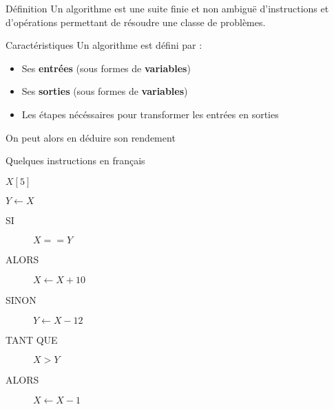 \begin{frame}{Définition}
    Un algorithme est une suite finie et non ambiguë d'instructions et d’opérations permettant de résoudre une classe de problèmes.
\end{frame}

\begin{frame}{Caractéristiques}
    Un algorithme est défini par :
    \begin{itemize}
        \item Ses \textbf{entrées} (sous formes de \textbf{variables})
        \item Ses \textbf{sorties} (sous formes de \textbf{variables})
        \item Les étapes nécéssaires pour transformer les entrées en sorties
    \end{itemize}
    On peut alors en déduire son rendement
\end{frame}

\begin{frame}{Quelques instructions en français}
    
    \begin{description}[<+->]
        \item [\blue{ACCES}] $X[5]\;\;\;\;\;$ 
        \item []
        \item [\blue{AFFECTATION}] $Y \leftarrow X\;$  
        \item []
        \item [\blue{TEST}] 
        \begin{description}
            \item [SI] $X == Y$
            \item [ALORS] $X \leftarrow X + 10$
            \item [SINON] $Y \leftarrow X - 12$
        \end{description}
        \item []
        \item [\blue{BOUCLE}] 
        \begin{description}
            \item [TANT QUE] $X > Y$
            \item [ALORS] $X \leftarrow X - 1$
        \end{description}
    \end{description}

    
\end{frame}

